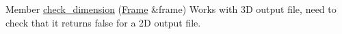 
\begin{DoxyRefList}
\item[Member \mbox{\hyperlink{parse_8h_a8ea5737d9075c49b931c9886e892125c}{check\+\_\+dimension}} (\mbox{\hyperlink{structFrame}{Frame}} \&frame)]\label{todo__todo000001}%
%
Works with 3D output file, need to check that it returns false for a 2D output file. 
\end{DoxyRefList}